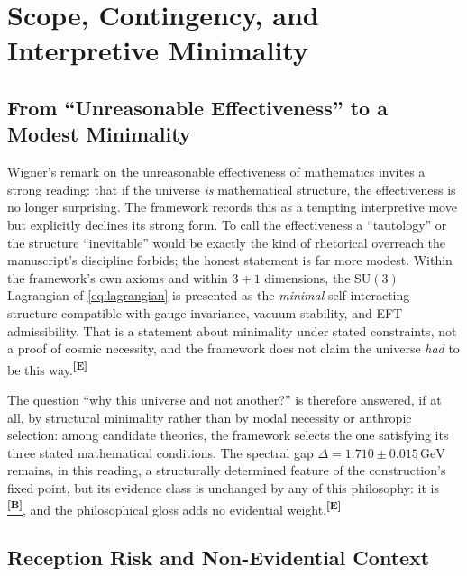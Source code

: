 \documentclass[12pt,a4paper,twoside]{article}
\theoremstyle{plain}
\theoremstyle{definition}
\theoremstyle{remark}
\newcommand{\GeV}{\,\mathrm{GeV}}
\newcommand{\catmark}[1]{\textsuperscript{\textsf{\textbf{[#1]}}}}
\newcommand{\Bdelta}{\hyperref[box:pi-override-delta]{\catmark{B}}}
\newcommand{\DeltaGap}{1.710 \pm 0.015\GeV} %
\begin{document}
\newpage
\section{Scope, Contingency, and Interpretive Minimality}
\label{sec:inevitability-sociology}

\subsection{From ``Unreasonable Effectiveness'' to a Modest Minimality}
\label{subsec:inevitability}

Wigner's remark on the unreasonable effectiveness of mathematics invites a strong reading: that if the universe \emph{is} mathematical structure, the effectiveness is no longer surprising. The framework records this as a tempting interpretive move but explicitly declines its strong form. To call the effectiveness a ``tautology'' or the structure ``inevitable'' would be exactly the kind of rhetorical overreach the manuscript's discipline forbids; the honest statement is far more modest. Within the framework's own axioms and within $3+1$ dimensions, the $\mathrm{SU}(3)$ Lagrangian of \cref{eq:lagrangian} is presented as the \emph{minimal} self-interacting structure compatible with gauge invariance, vacuum stability, and EFT admissibility. That is a statement about minimality under stated constraints, not a proof of cosmic necessity, and the framework does not claim the universe \emph{had} to be this way.\catmark{E}

The question ``why this universe and not another?'' is therefore answered, if at all, by structural minimality rather than by modal necessity or anthropic selection: among candidate theories, the framework selects the one satisfying its three stated mathematical conditions. The spectral gap $\Delta = \DeltaGap$ remains, in this reading, a structurally determined feature of the construction's fixed point, but its evidence class is unchanged by any of this philosophy: it is \Bdelta, and the philosophical gloss adds no evidential weight.\catmark{E}

\subsection{Reception Risk and Non-Evidential Context}
\label{subsec:sociology}
\end{document}
